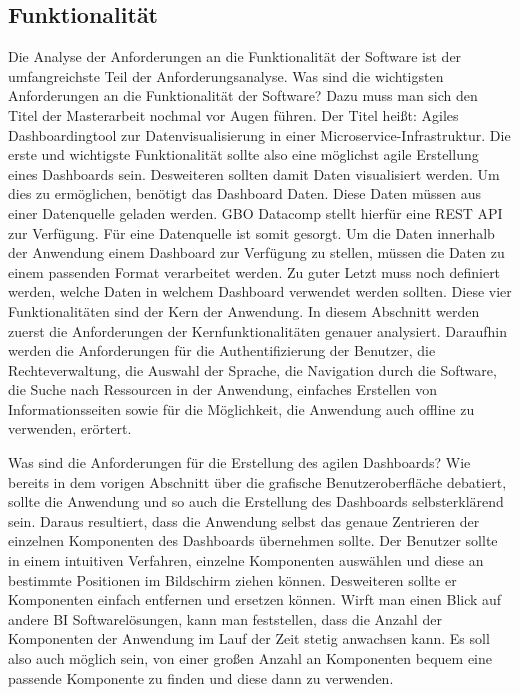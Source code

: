 \subsection{Funktionalität}
Die Analyse der Anforderungen an die Funktionalität der Software ist der
umfangreichste Teil der Anforderungsanalyse. Was sind die wichtigsten Anforderungen
an die Funktionalität der Software? Dazu muss man sich den Titel der Masterarbeit
nochmal vor Augen führen. Der Titel heißt: Agiles Dashboardingtool zur Datenvisualisierung
in einer Microservice-Infrastruktur. Die erste und wichtigste Funktionalität sollte also
eine möglichst agile Erstellung eines Dashboards sein. Desweiteren sollten damit Daten
visualisiert werden. Um dies zu ermöglichen, benötigt das Dashboard Daten. Diese Daten
müssen aus einer Datenquelle geladen werden. GBO Datacomp stellt hierfür eine REST API
zur Verfügung. Für eine Datenquelle ist somit gesorgt. Um die Daten innerhalb der Anwendung
einem Dashboard zur Verfügung zu stellen, müssen die Daten zu einem passenden Format verarbeitet werden.
Zu guter Letzt muss noch definiert werden, welche Daten in welchem Dashboard verwendet
werden sollten. Diese vier Funktionalitäten sind der Kern der Anwendung. In diesem Abschnitt
werden zuerst die Anforderungen der Kernfunktionalitäten genauer analysiert. Daraufhin werden die Anforderungen
für die Authentifizierung der Benutzer, die Rechteverwaltung, die Auswahl der Sprache,
die Navigation durch die Software, die Suche nach Ressourcen in der Anwendung, einfaches
Erstellen von Informationsseiten sowie für die Möglichkeit, die Anwendung auch offline
zu verwenden, erörtert.

Was sind die Anforderungen für die Erstellung des agilen Dashboards? Wie bereits in dem
vorigen Abschnitt über die grafische Benutzeroberfläche debatiert, sollte die Anwendung und
so auch die Erstellung des Dashboards selbsterklärend sein. Daraus resultiert, dass die Anwendung 
selbst das genaue Zentrieren der einzelnen Komponenten des Dashboards übernehmen sollte. Der
Benutzer sollte in einem intuitiven Verfahren, einzelne Komponenten auswählen und diese
an bestimmte Positionen im Bildschirm ziehen können. Desweiteren sollte er Komponenten einfach
entfernen und ersetzen können. Wirft man einen Blick auf andere BI Softwarelösungen,
kann man feststellen, dass die Anzahl der Komponenten der Anwendung im Lauf der Zeit
stetig anwachsen kann. Es soll also auch möglich sein, von einer großen Anzahl an Komponenten
bequem eine passende Komponente zu finden und diese dann zu verwenden.

